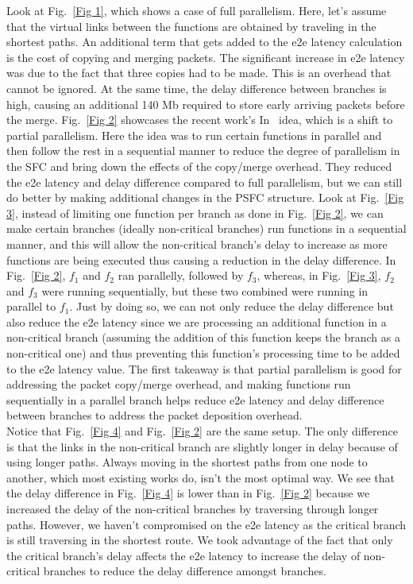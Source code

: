 \documentclass[journal]{IEEEtran}
\begin{document}
Look at Fig.~\ref{Fig 1}, which shows a case of full parallelism. Here, let’s assume that the virtual links between the functions are obtained by traveling in the shortest paths. An additional term that gets added to the e2e latency calculation is the cost of copying and merging packets. The significant increase in e2e latency was due to the fact that three copies had to be made. This is an overhead that cannot be ignored. At the same time, the delay difference between branches is high, causing an additional 140 Mb required to store early arriving packets before the merge. Fig.~\ref{Fig 2} showcases the recent work’s In~\cite{TON} idea, which is a shift to partial parallelism. Here the idea was to run certain functions in parallel and then follow the rest in a sequential manner to reduce the degree of parallelism in the SFC and bring down the effects of the copy/merge overhead. They reduced the e2e latency and delay difference compared to full parallelism, but we can still do better by making additional changes in the PSFC structure. Look at Fig.~\ref{Fig 3}, instead of limiting one function per branch as done in Fig.~\ref{Fig 2}, we can make certain branches (ideally non-critical branches) run functions in a sequential manner, and this will allow the non-critical branch’s delay to increase as more functions are being executed thus causing a reduction in the delay difference. In Fig.~\ref{Fig 2}, $f_1$ and $f_2$ ran parallelly, followed by $f_3$, whereas, in Fig.~\ref{Fig 3}, $f_2$ and $f_3$ were running sequentially, but these two combined were running in parallel to $f_1$. Just by doing so, we can not only reduce the delay difference but also reduce the e2e latency since we are processing an additional function in a non-critical branch (assuming the addition of this function keeps the branch as a non-critical one) and thus preventing this function’s processing time to be added to the e2e latency value. The first takeaway is that partial parallelism is good for addressing the packet copy/merge overhead, and making functions run sequentially in a parallel branch helps reduce e2e latency and delay difference between branches to address the packet deposition overhead.\\

Notice that Fig.~\ref{Fig 4} and Fig.~\ref{Fig 2} are the same setup. The only difference is that the links in the non-critical branch are slightly longer in delay because of using longer paths. Always moving in the shortest paths from one node to another, which most existing works do, isn’t the most optimal way.  We see that the delay difference in Fig.~\ref{Fig 4} is lower than in Fig.~\ref{Fig 2} because we increased the delay of the non-critical branches by traversing through longer paths. However, we haven’t compromised on the e2e latency as the critical branch is still traversing in the shortest route. We took advantage of the fact that only the critical branch’s delay affects the e2e latency to increase the delay of non-critical branches to reduce the delay difference amongst branches.
\end{document}
